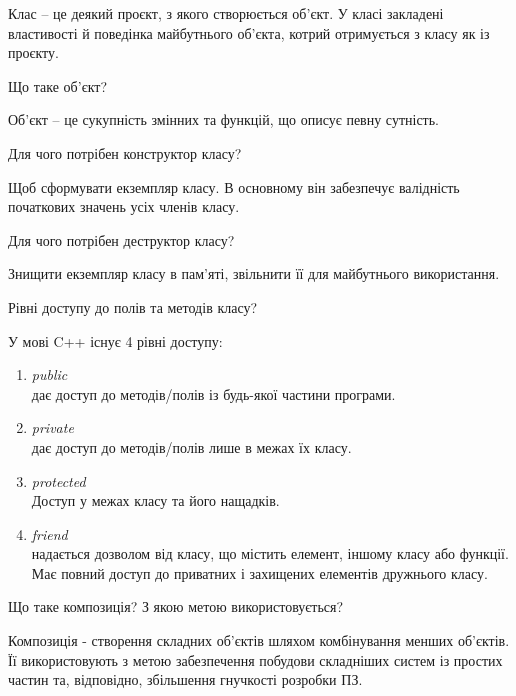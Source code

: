 \documentclass[a4paper, 12pt, oneside]{extarticle}
\begin{document}
\begin{itemize}

\answer	Клас – це деякий проєкт, з якого створюється об’єкт. У класі закладені
властивості й поведінка майбутнього об’єкта, котрий отримується з класу як із
проєкту.

\question	Що таке об’єкт?

\answer	Об’єкт – це сукупність змінних та функцій, що описує певну сутність.

\question	Для чого потрібен конструктор класу?

\answer	Щоб сформувати екземпляр класу.
В основному він забезпечує валідність початкових значень усіх членів класу.

\question	Для чого потрібен деструктор класу?

\answer	Знищити екземпляр класу в пам'яті, звільнити її для майбутнього використання.

\question	Рівні доступу до полів та методів класу?

\answer	У мові C++ існує 4 рівні доступу:
		\begin{enumerate}
			\item \textit{public}\\
				дає доступ до методів/полів із будь-якої частини програми.
			\item \textit{private}\\
				дає доступ до методів/полів лише в межах їх класу.
			\item \textit{protected}\\
				Доступ у межах класу та його нащадків.
			\item \textit{friend}\\
				надається дозволом від класу, що містить елемент, іншому класу або функції. Має повний доступ до приватних і захищених елементів дружнього класу.
		\end{enumerate}

\question	Що таке композиція? З якою метою використовується?

\answer	Композиція - створення складних об'єктів шляхом комбінування менших об'єктів. Її
використовують з метою забезпечення побудови складніших систем із простих частин та,
відповідно, збільшення гнучкості розробки ПЗ.

\end{itemize}
\end{document}
